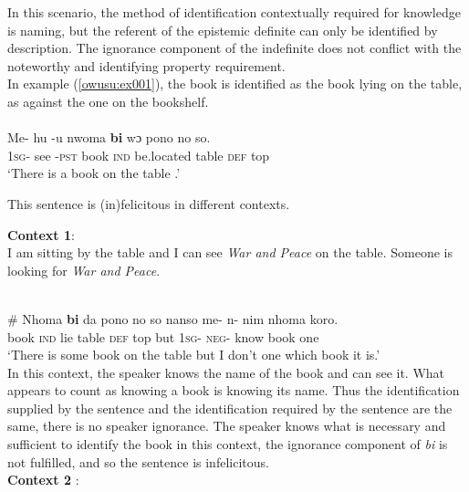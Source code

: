 \documentclass[output=paper,modfonts,nonflat,draftmode]{langsci/langscibook}
\begin{document}
 \z  
In this scenario, the method of identification contextually required for knowledge is naming, but the referent of the epistemic definite can only be identified by description. The ignorance component of the indefinite does not conflict with the noteworthy and identifying property requirement.\\

In example (\ref{owusu:ex001}), the book is identified as the book lying on the table, as against the one on the bookshelf.  \\
\ea\label{owusu:ex001}\\
\gll Me- hu -u nwoma \textbf{bi} wɔ pono no so.\\
	     \textsc{1sg}- see -\textsc{pst}  book \textsc{ind} be.located table \textsc{def}  top\\

\glt `There is a book on the table .'\\

 \z 
 
This sentence is (in)felicitous in different contexts.

\textbf{Context 1}:\\
I am sitting by the table and I can see \emph{\emph{War and Peace}} on the table. Someone is looking for \emph{\emph{War and Peace}}.

\ea\label{owusu:ex00}\\
\gll \# Nhoma \textbf{bi} da pono no so nanso me- n- nim nhoma koro.\\
	     {} book \textsc{ind}  lie table \textsc{def}  top but \textsc{1sg}- \textsc{neg}- know book one\\

\glt `There is some book on the table but I don't one which book it is.'\\

 \z  In this context, the speaker knows the name of the book and can see it. What appears to count as knowing a book is knowing its name. Thus the identification supplied by the sentence and the identification required by the sentence are the same, there is no speaker ignorance. The speaker knows what is necessary and sufficient to identify the book in this context, the ignorance component of \emph{bi} is not fulfilled, and so the sentence is infelicitous. \\

\textbf{Context 2} :\\
\end{document}
